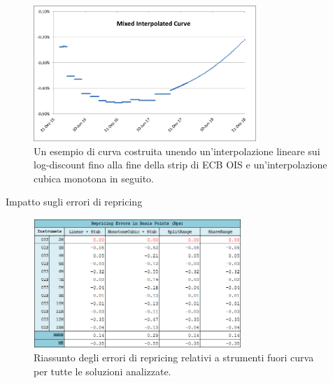 \begin{tframe}
\begin{figure}[!h]
\centering
\includegraphics[width=0.75\textwidth]{splitrange.png}
\caption{Un esempio di curva costruita unendo un'interpolazione lineare sui log-discount fino alla fine della strip di ECB OIS e un'interpolazione cubica monotona in seguito.}
\label{fig:splitrange}
\end{figure}
\end{tframe}
\begin{tframe}{Impatto sugli errori di repricing}
\begin{figure}[!h]
\centering
\includegraphics[width=0.70\textwidth]{repricingmixed.png}
\caption{Riassunto degli errori di repricing relativi a strumenti fuori curva per tutte le soluzioni analizzate.}
\label{fig:repricingmixed}
\end{figure}
\end{tframe}
